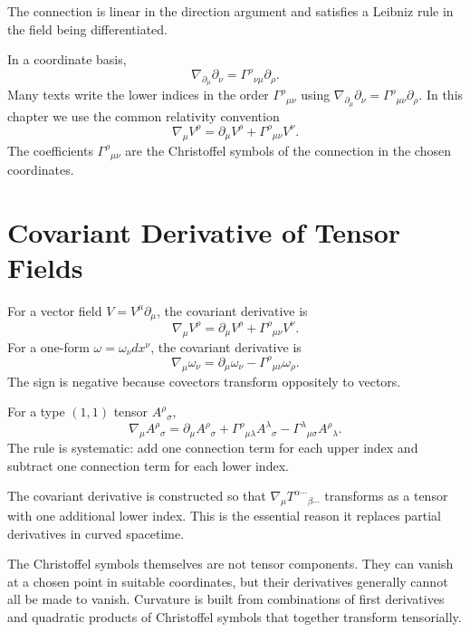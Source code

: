 The connection is linear in the direction argument and satisfies a Leibniz rule
in the field being differentiated.

In a coordinate basis,
\[
\nabla_{\partial_\mu}\partial_\nu
=\Gamma^\rho{}_{\nu\mu}\partial_\rho.
\]
Many texts write the lower indices in the order \(\Gamma^\rho{}_{\mu\nu}\) using
\(\nabla_{\partial_\mu}\partial_\nu=\Gamma^\rho{}_{\mu\nu}\partial_\rho\). In this
chapter we use the common relativity convention
\[
\nabla_\mu V^\rho=\partial_\mu V^\rho+\Gamma^\rho{}_{\mu\nu}V^\nu.
\]
The coefficients \(\Gamma^\rho{}_{\mu\nu}\) are the Christoffel symbols of the
connection in the chosen coordinates.

\clearpage

\section{Covariant Derivative of Tensor Fields}

For a vector field \(V=V^\mu\partial_\mu\), the covariant derivative is
\[
\nabla_\mu V^\rho=\partial_\mu V^\rho+\Gamma^\rho{}_{\mu\nu}V^\nu.
\]
For a one-form \(\omega=\omega_\nu dx^\nu\), the covariant derivative is
\[
\nabla_\mu\omega_\nu=\partial_\mu\omega_\nu-
\Gamma^\rho{}_{\mu\nu}\omega_\rho.
\]
The sign is negative because covectors transform oppositely to vectors.

For a type \((1,1)\) tensor \(A^\rho{}_{\sigma}\),
\[
\nabla_\mu A^\rho{}_{\sigma}
=
\partial_\mu A^\rho{}_{\sigma}
+\Gamma^\rho{}_{\mu\lambda}A^\lambda{}_{\sigma}
-\Gamma^\lambda{}_{\mu\sigma}A^\rho{}_{\lambda}.
\]
The rule is systematic: add one connection term for each upper index and
subtract one connection term for each lower index.

The covariant derivative is constructed so that \(\nabla_\mu T^{\alpha\cdots}{}_{\beta\cdots}\)
transforms as a tensor with one additional lower index. This is the essential
reason it replaces partial derivatives in curved spacetime.

\begin{remarkbox}
The Christoffel symbols themselves are not tensor components. They can vanish at
a chosen point in suitable coordinates, but their derivatives generally cannot
all be made to vanish. Curvature is built from combinations of first derivatives
and quadratic products of Christoffel symbols that together transform tensorially.
\end{remarkbox}

\clearpage

